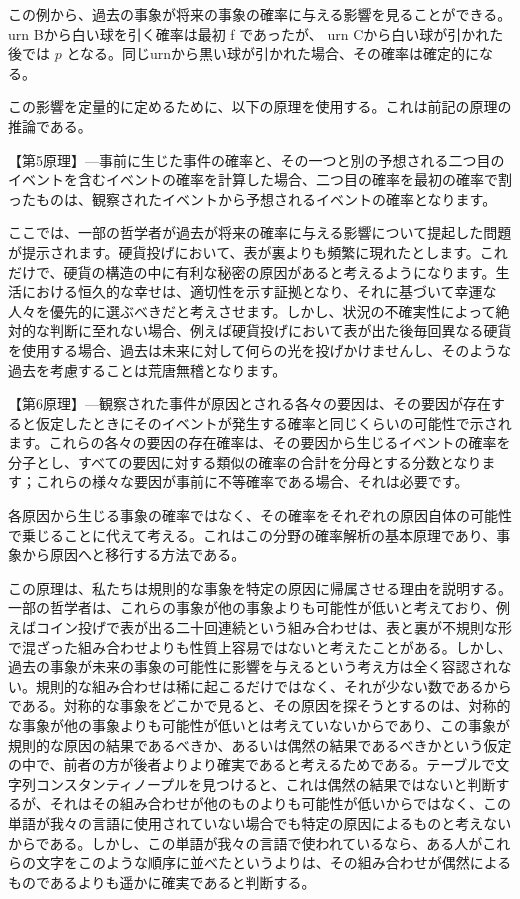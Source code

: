 \documentclass[a4paper,11pt,openany]{ltjsbook}
\begin{document}
この例から、過去の事象が将来の事象の確率に与える影響を見ることができる。 urn Bから白い球を引く確率は最初 f であったが、 urn Cから白い球が引かれた後では $p$ となる。同じurnから黒い球が引かれた場合、その確率は確定的になる。

この影響を定量的に定めるために、以下の原理を使用する。これは前記の原理の推論である。

【第5原理】—事前に生じた事件の確率と、その一つと別の予想される二つ目のイベントを含むイベントの確率を計算した場合、二つ目の確率を最初の確率で割ったものは、観察されたイベントから予想されるイベントの確率となります。

ここでは、一部の哲学者が過去が将来の確率に与える影響について提起した問題が提示されます。硬貨投げにおいて、表が裏よりも頻繁に現れたとします。これだけで、硬貨の構造の中に有利な秘密の原因があると考えるようになります。生活における恒久的な幸せは、適切性を示す証拠となり、それに基づいて幸運な人々を優先的に選ぶべきだと考えさせます。しかし、状況の不確実性によって絶対的な判断に至れない場合、例えば硬貨投げにおいて表が出た後毎回異なる硬貨を使用する場合、過去は未来に対して何らの光を投げかけませんし、そのような過去を考慮することは荒唐無稽となります。

【第6原理】—観察された事件が原因とされる各々の要因は、その要因が存在すると仮定したときにそのイベントが発生する確率と同じくらいの可能性で示されます。これらの各々の要因の存在確率は、その要因から生じるイベントの確率を分子とし、すべての要因に対する類似の確率の合計を分母とする分数となります；これらの様々な要因が事前に不等確率である場合、それは必要です。

各原因から生じる事象の確率ではなく、その確率をそれぞれの原因自体の可能性で乗じることに代えて考える。これはこの分野の確率解析の基本原理であり、事象から原因へと移行する方法である。

この原理は、私たちは規則的な事象を特定の原因に帰属させる理由を説明する。一部の哲学者は、これらの事象が他の事象よりも可能性が低いと考えており、例えばコイン投げで表が出る二十回連続という組み合わせは、表と裏が不規則な形で混ざった組み合わせよりも性質上容易ではないと考えたことがある。しかし、過去の事象が未来の事象の可能性に影響を与えるという考え方は全く容認されない。規則的な組み合わせは稀に起こるだけではなく、それが少ない数であるからである。対称的な事象をどこかで見ると、その原因を探そうとするのは、対称的な事象が他の事象よりも可能性が低いとは考えていないからであり、この事象が規則的な原因の結果であるべきか、あるいは偶然の結果であるべきかという仮定の中で、前者の方が後者よりより確実であると考えるためである。テーブルで文字列コンスタンティノープルを見つけると、これは偶然の結果ではないと判断するが、それはその組み合わせが他のものよりも可能性が低いからではなく、この単語が我々の言語に使用されていない場合でも特定の原因によるものと考えないからである。しかし、この単語が我々の言語で使われているなら、ある人がこれらの文字をこのような順序に並べたというよりは、その組み合わせが偶然によるものであるよりも遥かに確実であると判断する。
\end{document}
